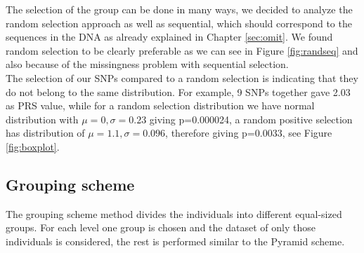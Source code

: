 \documentclass[letterpaper, 11pt]{article}
\begin{document}
The selection of the group can be done in many ways, we decided to analyze the random selection approach as well as sequential, which should correspond to the sequences in the DNA as already explained in Chapter \ref{sec:omit}. We found random selection to be clearly preferable as we can see in Figure \ref{fig:randseq} and also because of the missingness problem with sequential selection.\\

The selection of our SNPs compared to a random selection is indicating that they do not belong to the same distribution. For example, 9 SNPs together gave 2.03 as PRS value, while for a random selection distribution we have normal distribution with $\mu =0, \sigma=0.23$ giving p=0.000024, a random positive selection has distribution of $\mu =1.1, \sigma=0.096$, therefore giving p=0.0033, see Figure \ref{fig:boxplot}.

  
\subsection{Grouping scheme}
\begin{figure} [!h] 
\end{figure}
The grouping scheme method divides the individuals into different equal-sized groups. For each level one group is chosen and the dataset of only those individuals is considered, the rest is performed similar to the Pyramid scheme. 
\end{document}
